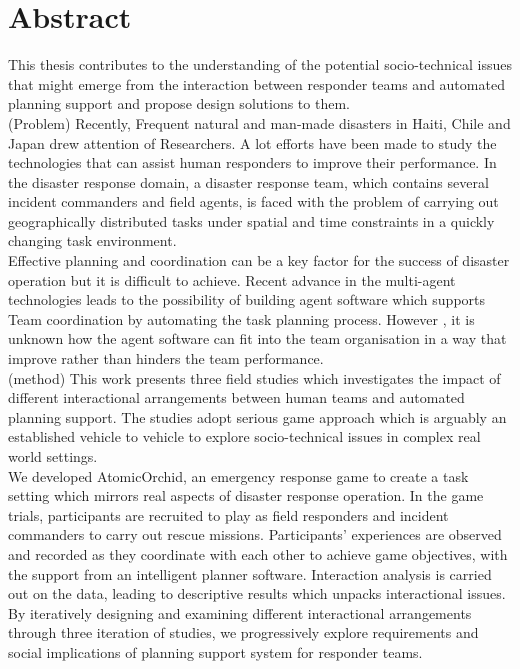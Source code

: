 \begingroup
\let\clearpage\relax
\let\cleardoublepage\relax
\let\cleardoublepage\relax

\chapter*{Abstract}
\noindent This thesis contributes to the understanding of the potential socio-technical issues that might emerge from the interaction between responder teams and automated planning support and propose design solutions to them. \\

(Problem) Recently, Frequent natural and man-made disasters in Haiti, Chile and Japan drew attention of Researchers. A lot efforts have been made to study the technologies that can assist human responders to improve their performance. In the disaster response domain,  a disaster response team, which contains several incident commanders and field agents, is faced with the problem of carrying out geographically distributed tasks under spatial and time constraints in a quickly changing task environment. \\ 

\noindent Effective planning and coordination can be a key factor for the success of disaster operation but it is difficult to achieve. Recent advance in the multi-agent technologies leads to the possibility of building agent software which supports Team coordination by automating the task planning process. However , it is unknown how the agent software can fit into the team organisation in a way that improve rather than hinders the team performance. \\

\noindent (method) This work presents three field studies which investigates the impact of different interactional arrangements between human teams and automated planning support. The studies adopt serious game approach which is arguably an established vehicle to vehicle to explore socio-technical issues in complex real world settings.\\

\noindent  We developed AtomicOrchid, an emergency response game to create a task setting which mirrors real aspects of disaster response operation. In the game trials, participants are recruited to play as field responders and incident commanders to carry out rescue missions. Participants' experiences are observed and recorded as they coordinate with each other to achieve game objectives, with the support from an intelligent planner software. Interaction analysis is carried out on the data, leading to descriptive results which unpacks interactional issues. By iteratively designing and examining different interactional arrangements through three iteration of studies, we progressively explore requirements and social implications of planning support system for responder teams.\\

